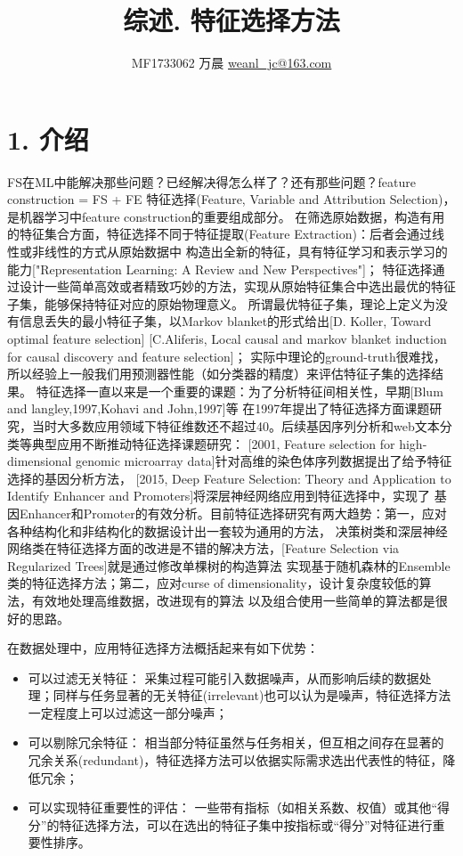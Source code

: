 \documentclass[a4paper,UTF8]{article}
\begin{document}
\title{综述. 特征选择方法}
\author{MF1733062 万晨 \url{weanl_jc@163.com}}
\maketitle

\section*{1. 介绍}
  FS在ML中能解决那些问题？已经解决得怎么样了？还有那些问题？feature construction = FS + FE
  特征选择(Feature, Variable and Attribution Selection)，是机器学习中feature construction的重要组成部分。
  在筛选原始数据，构造有用的特征集合方面，特征选择不同于特征提取(Feature Extraction)：后者会通过线性或非线性的方式从原始数据中
  构造出全新的特征，具有特征学习和表示学习的能力["Representation Learning: A Review and New Perspectives"]；
  特征选择通过设计一些简单高效或者精致巧妙的方法，实现从原始特征集合中选出最优的特征子集，能够保持特征对应的原始物理意义。
  所谓最优特征子集，理论上定义为没有信息丢失的最小特征子集，以Markov blanket的形式给出[D. Koller, Toward optimal feature selection]
  [C.Aliferis, Local causal and markov blanket induction for causal discovery and feature selection]；
  实际中理论的ground-truth很难找，所以经验上一般我们用预测器性能（如分类器的精度）来评估特征子集的选择结果。
  特征选择一直以来是一个重要的课题：为了分析特征间相关性，早期[Blum and langley,1997,Kohavi and John,1997]等
  在1997年提出了特征选择方面课题研究，当时大多数应用领域下特征维数还不超过40。后续基因序列分析和web文本分类等典型应用不断推动特征选择课题研究：
  [2001, Feature selection for high-dimensional genomic microarray data]针对高维的染色体序列数据提出了给予特征选择的基因分析方法，
  [2015, Deep Feature Selection: Theory and Application to Identify Enhancer and Promoters]将深层神经网络应用到特征选择中，实现了
  基因Enhancer和Promoter的有效分析。目前特征选择研究有两大趋势：第一，应对各种结构化和非结构化的数据设计出一套较为通用的方法，
  决策树类和深层神经网络类在特征选择方面的改进是不错的解决方法，[Feature Selection via Regularized Trees]就是通过修改单棵树的构造算法
  实现基于随机森林的Ensemble类的特征选择方法；第二，应对curse of dimensionality，设计复杂度较低的算法，有效地处理高维数据，改进现有的算法
  以及组合使用一些简单的算法都是很好的思路。

  在数据处理中，应用特征选择方法概括起来有如下优势：
  \begin{itemize}
    \item 可以过滤无关特征：
    采集过程可能引入数据噪声，从而影响后续的数据处理；同样与任务显著的无关特征(irrelevant)也可以认为是噪声，特征选择方法一定程度上可以过滤这一部分噪声；

    \item 可以剔除冗余特征：
    相当部分特征虽然与任务相关，但互相之间存在显著的冗余关系(redundant)，特征选择方法可以依据实际需求选出代表性的特征，降低冗余；

    \item 可以实现特征重要性的评估：
    一些带有指标（如相关系数、权值）或其他“得分”的特征选择方法，可以在选出的特征子集中按指标或“得分”对特征进行重要性排序。

  \end{itemize}
\end{document}

